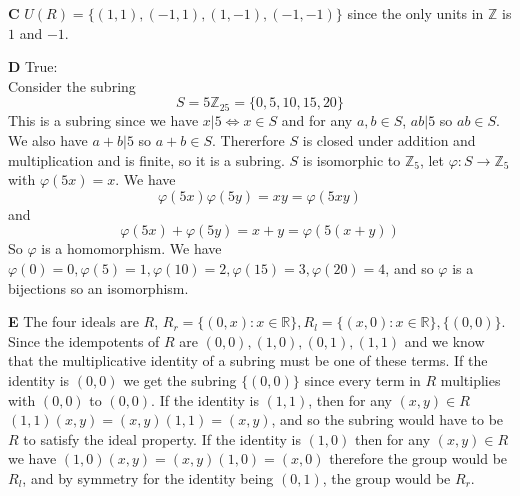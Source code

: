 \documentclass[12pt]{article}
\newenvironment{ques}{\vspace{2 ex}}{\vspace{2 ex}}
\theoremstyle{definition}
\begin{document}
\begin{ques}
	\textbf{C}
	$U(R) = \{(1,1), (-1, 1), (1, -1), (-1,-1)\}$ since the only units in
	$\mathbb Z$ is $1$ and $-1$.
\end{ques}

\begin{ques}
	\textbf{D}
	True:\\
	Consider the subring
	$$S = 5\mathbb Z _{25} = \{0, 5, 10, 15, 20\}$$
	This is a subring since we have $x|5 \Leftrightarrow x \in S$ and for
	any $a, b \in S$, $ab | 5$ so $ab \in S$. We also have $a + b |5$ so $a
	+b \in S$. Thererfore $S$ is closed under addition and multiplication
	and is finite, so it is a subring. $S$ is isomorphic to $\mathbb Z _5$,
	let $\varphi: S \to \mathbb Z_5$ with $\varphi(5x) = x$. We have
	$$\varphi(5x)\varphi(5y) = xy = \varphi(5xy)$$
	and
	$$\varphi(5x) + \varphi(5y) = x + y = \varphi(5(x + y))$$
	So $\varphi$ is a homomorphism. We have $\varphi(0) = 0, \varphi(5) =
	1, \varphi(10) = 2, \varphi(15) = 3, \varphi(20) = 4$, and so $\varphi$
	is a bijections so an isomorphism.
\end{ques}

\begin{ques}
	\textbf{E}
	The four ideals are $R$, $R_r = \{(0,x): x \in \mathbb R\}, R_l =
	\{(x,0): x \in \mathbb R\}, \{(0,0)\}$. Since the idempotents of $R$
	are $(0,0), (1,0), (0,1), (1,1)$ and we know that the multiplicative
	identity of a subring must be one of these terms. If the identity is
	$(0,0)$ we get the subring $\{(0,0)\}$ since every term in $R$
	multiplies with $(0,0)$ to $(0,0)$. If the identity is $(1,1)$, then
	for any $(x,y) \in R$ $(1,1)(x,y) = (x,y)(1,1) = (x,y)$, and so the
	subring would have to be $R$ to satisfy the ideal property. If the
	identity is $(1,0)$ then for any $(x,y) \in R$ we have $(1,0)(x,y) =
	(x,y)(1,0) = (x,0)$ therefore the group would be $R_l$, and by symmetry
	for the identity being $(0,1)$, the group would be $R_r$.
\end{ques}
\end{document}
